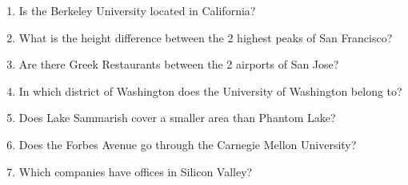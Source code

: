 \documentclass[12pt]{report}
\begin{document}
\begin{enumerate}
    \item Is the Berkeley University located in California?
    \item What is the height difference between the 2 highest peaks of San Francisco?
    \item Are there Greek Restaurants between the 2 airports of San Jose?
    \item In which district of Washington does the University of Washington belong to?
    \item Does Lake Sammarish cover a smaller area than Phantom Lake?
    \item Does the Forbes Avenue go through the Carnegie Mellon University?
    \item Which companies have offices in Silicon Valley?
\end{enumerate}
\end{document}
